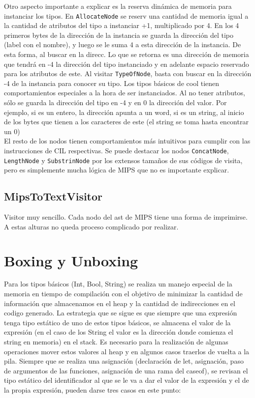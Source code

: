 \documentclass[a4paper,12pt]{article}
\def\code#1{\texttt{#1}}
\begin{document}
Otro aspecto importante a explicar es la reserva dinámica de memoria para instanciar los tipos. En \code{AllocateNode} se reserv una cantidad de memoria igual a la cantidad de atributos del tipo a instanciar +1, multiplicado por 4. En los 4 primeros bytes de la dirección de la instancia se guarda la dirección del tipo (label con el nombre), y luego se le suma 4 a esta dirección de la instancia. De esta forma, al buscar en la direcc. Lo que se retorna es una dirección de memoria que tendrá en -4 la dirección del tipo instanciado y en adelante espacio reservado para los atributos de este. Al visitar \code{TypeOfNode}, basta con buscar en la dirección -4 de la instancia para conocer su tipo. Los tipos básicos de cool tienen comportamientos especiales a la hora de ser instanciados. Al no tener atributos, sólo se guarda la dirección del tipo en -4 y en 0 la dirección del valor. Por ejemplo, si es un entero, la dirección apunta a un word, si es un string, al inicio de los bytes que tienen a los caracteres de este (el string se toma hasta encontrar un 0)\\

El resto de los nodos tienen comportamientos más intuitivos para cumplir con las instrucciones de CIL respectivas. Se puede destacar los nodos \code{ConcatNode}, \code{LengthNode} y \code{SubstrinNode} por los extensos tamaños de sus códigos de visita, pero es simplemente mucha lógica de MIPS que no es importante explicar.

\subsection*{MipsToTextVisitor}
Visitor muy sencillo. Cada nodo del ast de MIPS tiene una forma de imprimirse. A estas alturas no queda proceso complicado por realizar.

\section*{Boxing y Unboxing}
Para los tipos básicos (Int, Bool, String) se realiza un manejo especial de la memoria en tiempo de compilación con el objetivo de minimizar la cantidad de información que almacenamos en el heap y la cantidad de indirecciones en el codigo generado. La estrategia que se sigue es que siempre que una expresión tenga tipo estático de uno de estos tipos básicos, se almacena el valor de la expresión (en el caso de los String el valor es la dirección donde comienza el string en memoria) en el stack. Es necesario para la realización de algunas operaciones mover estos valores al heap y en algunos casos traerlos de vuelta a la pila. Siempre que se realiza una asignación (declaración de let, asignación, paso de argumentos de las funciones, asignación de una rama del caseof), se revisan el tipo estático del identificador al que se le va a dar el valor de la expresión y el de la propia expresión, pueden darse tres casos en este punto:
\end{document}
